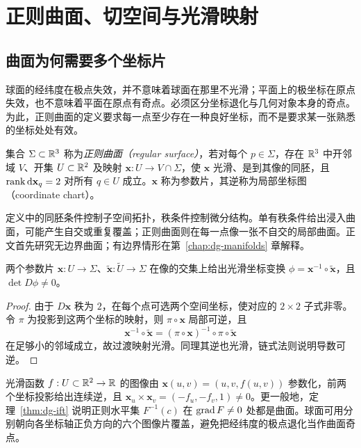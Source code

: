 \setcounter{chapter}{3} %
\chapter{正则曲面、切空间与光滑映射}
\label{chap:dg-surfaces}

\section{曲面为何需要多个坐标片}
球面的经纬度在极点失效，并不意味着球面在那里不光滑；平面上的极坐标在原点失效，也不意味着平面在原点有奇点。必须区分坐标退化与几何对象本身的奇点。为此，正则曲面的定义要求每一点至少存在一种良好坐标，而不是要求某一张熟悉的坐标处处有效。

\begin{definition}[正则曲面与参数片]
集合 $\Sigma\subset\mathbb R^3$ 称为\emph{正则曲面（regular surface）}，若对每个 $p\in\Sigma$，存在 $\mathbb R^3$ 中开邻域 $V$、开集 $U\subset\mathbb R^2$ 及映射 $\mathbf x:U\to V\cap\Sigma$，使 $\mathbf x$ 光滑、是到其像的同胚，且 $\operatorname{rank}\mathop{}\!\mathrm d\mathbf x_q=2$ 对所有 $q\in U$ 成立。$\mathbf x$ 称为参数片，其逆称为局部坐标图（coordinate chart）。
\label{def:dg-surface}
\end{definition}
定义中的同胚条件控制子空间拓扑，秩条件控制微分结构。单有秩条件给出浸入曲面，可能产生自交或重复覆盖；正则曲面则在每一点像一张不自交的局部曲面。正文首先研究无边界曲面；有边界情形在第~\ref{chap:dg-manifolds} 章解释。

\begin{proposition}[坐标过渡的光滑性]
两个参数片 $\mathbf x:U\to\Sigma$、$\widetilde{\mathbf x}:\widetilde U\to\Sigma$ 在像的交集上给出光滑坐标变换 $\phi=\mathbf x^{-1}\circ\widetilde{\mathbf x}$，且 $\det D\phi\ne0$。
\end{proposition}
\begin{proof}
由于 $D\mathbf x$ 秩为 $2$，在每个点可选两个空间坐标，使对应的 $2\times2$ 子式非零。令 $\pi$ 为投影到这两个坐标的映射，则 $\pi\circ\mathbf x$ 局部可逆，且
\[
 \mathbf x^{-1}\circ\widetilde{\mathbf x}
 =(\pi\circ\mathbf x)^{-1}\circ\pi\circ\widetilde{\mathbf x}
\]
在足够小的邻域成立，故过渡映射光滑。同理其逆也光滑，链式法则说明导数可逆。
\end{proof}

\begin{example}[图像、水平集与球面]
光滑函数 $f:U\subset\mathbb R^2\to\mathbb R$ 的图像由 $\mathbf x(u,v)=(u,v,f(u,v))$ 参数化，前两个坐标投影给出连续逆，且 $\mathbf x_u\times\mathbf x_v=(-f_u,-f_v,1)\ne0$。更一般地，定理~\ref{thm:dg-ift} 说明正则水平集 $F^{-1}(c)$ 在 $\operatorname{grad} F\ne0$ 处都是曲面。球面可用分别朝向各坐标轴正负方向的六个图像片覆盖，避免把经纬度的极点退化当作曲面奇点。
\end{example}

